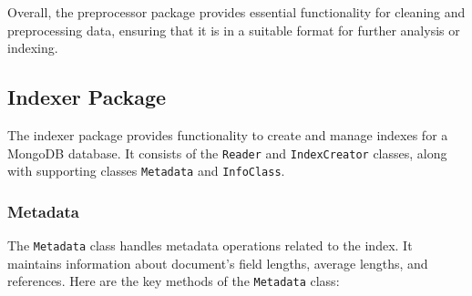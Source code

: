 \documentclass{article}
\begin{document}
Overall, the preprocessor package provides essential functionality for cleaning and 
preprocessing data, ensuring that it is in a suitable format for further analysis or indexing.

\subsection{Indexer Package}

The indexer package provides functionality to create and manage indexes for a MongoDB database. 
It consists of the \texttt{Reader} and \texttt{IndexCreator} classes, along with supporting 
classes \texttt{Metadata} and \texttt{InfoClass}.

%
%

\subsubsection{Metadata}

The \texttt{Metadata} class handles metadata operations related to the index. It maintains 
information about document's field lengths, average lengths, and references. Here are the key methods of 
the \texttt{Metadata} class:
\end{document}
